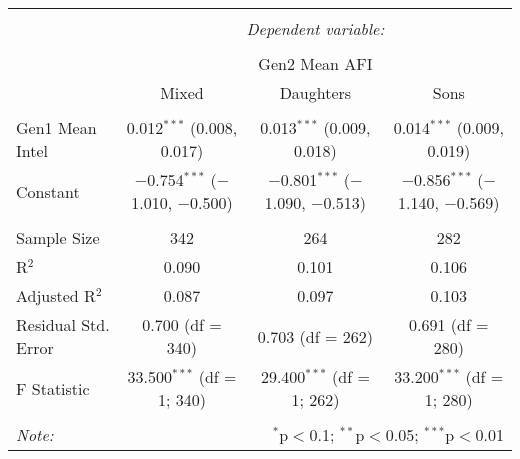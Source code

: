 
\begingroup 
\small 
\begin{tabular}{@{\extracolsep{1pt}}lccc} 
\\[-1.8ex]\hline 
\hline \\[-1.8ex] 
 & \multicolumn{3}{c}{\textit{Dependent variable:}} \\ 
\cline{2-4} 
\\[-1.8ex] & \multicolumn{3}{c}{Gen2 Mean AFI} \\ 
 & Mixed & Daughters & Sons \\ 
\hline \\[-1.8ex] 
 Gen1 Mean Intel & 0.012$^{***}$ (0.008, 0.017) & 0.013$^{***}$ (0.009, 0.018) & 0.014$^{***}$ (0.009, 0.019) \\ 
  Constant & $-$0.754$^{***}$ ($-$1.010, $-$0.500) & $-$0.801$^{***}$ ($-$1.090, $-$0.513) & $-$0.856$^{***}$ ($-$1.140, $-$0.569) \\ 
 \hline \\[-1.8ex] 
Sample Size & 342 & 264 & 282 \\ 
R$^{2}$ & 0.090 & 0.101 & 0.106 \\ 
Adjusted R$^{2}$ & 0.087 & 0.097 & 0.103 \\ 
Residual Std. Error & 0.700 (df = 340) & 0.703 (df = 262) & 0.691 (df = 280) \\ 
F Statistic & 33.500$^{***}$ (df = 1; 340) & 29.400$^{***}$ (df = 1; 262) & 33.200$^{***}$ (df = 1; 280) \\ 
\hline 
\hline \\[-1.8ex] 
\textit{Note:}  & \multicolumn{3}{r}{$^{*}$p$<$0.1; $^{**}$p$<$0.05; $^{***}$p$<$0.01} \\ 
\end{tabular} 
\endgroup 
